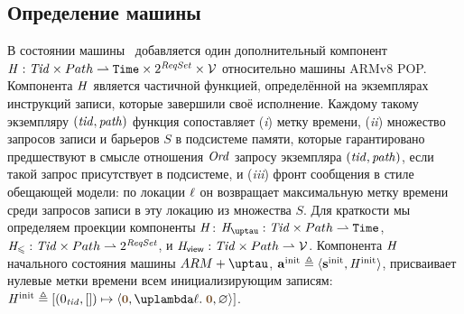 \subsection{Определение машины \ARMt}
В состоянии машины \ARMt~добавляется один дополнительный компонент 
$\mathit{H} : \mathit{Tid} \times Path \rightharpoonup \mathtt{Time} \times 2^{\mathit{ReqSet}} \times \mathcal{V}$
относительно машины ARMv8 POP.
Компонента $\mathit{H}$ является частичной функцией, определённой на экземплярах инструкций
записи, которые завершили своё исполнение.
Каждому такому экземпляру $(\mathit{tid}, \mathit{path})$ функция сопоставляет
(\emph{i}) метку времени,
(\emph{ii}) множество запросов записи и барьеров $S$ в подсистеме памяти,
которые гарантировано предшествуют в смысле отношения $\mathit{Ord}$ запросу экземпляра $(\mathit{tid}, \mathit{path})$,
если такой запрос присутствует в подсистеме,
и (\emph{iii}) фронт сообщения в стиле обещающей модели:
по локации $\ell$ он возвращает максимальную метку времени среди запросов записи
в эту локацию из множества $S$.
Для краткости мы определяем проекции компоненты $\mathit{H}$:
$\tmap: \Tid \times \Path \rightharpoonup \Timestamp$,
$\mathit{H}_{\leqslant}: \mathit{Tid} \times Path \rightharpoonup 2^{\mathit{ReqSet}}$, и
$\mathit{H}_{\mathsf{view}}: \mathit{Tid} \times Path \rightharpoonup \mathcal{V}$.
Компонента $\mathit{H}$ начального состояния машины $\ARMt$,
$\mathbf{a}^{\rm init} \triangleq \langle \mathbf{s}^{\rm init}, \mathit{H}^{\rm init} \rangle$,
присваивает нулевые метки времени всем инициализирующим записям:
$\hmap^{\rm init} \triangleq [(0_{\tId}, []) \mapsto
  \angled{\tstamp{0}, \lambda \loc. \; \tstamp{0}, \emptyset}]$.

